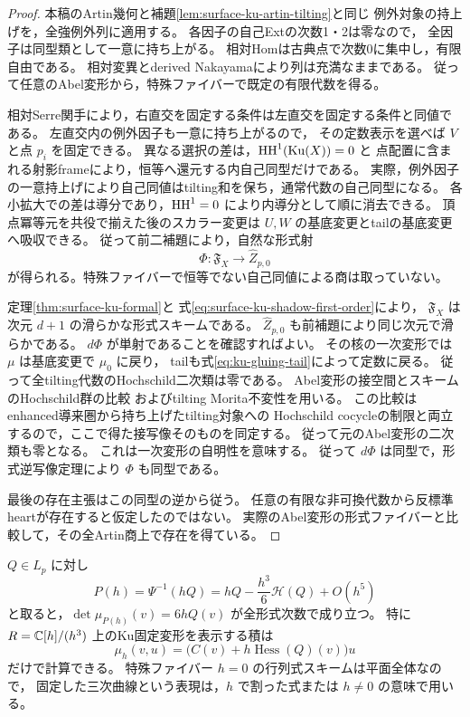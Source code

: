 \begin{proof}
本稿のArtin幾何と補題\ref{lem:surface-ku-artin-tilting}と同じ
例外対象の持上げを，全強例外列に適用する。
各因子の自己Extの次数1・2は零なので，
全因子は同型類として一意に持ち上がる。
相対Homは古典点で次数0に集中し，有限自由である。
相対変異とderived Nakayamaにより列は充満なままである。
従って任意のAbel変形から，特殊ファイバーで既定の有限代数を得る。

相対Serre関手により，右直交を固定する条件は左直交を固定する条件と同値である。
左直交内の例外因子も一意に持ち上がるので，
その定数表示を選べば $V$ と点 $p_i$ を固定できる。
異なる選択の差は，$\operatorname{HH}^1(\operatorname{Ku}(X))=0$ と
点配置に含まれる射影frameにより，恒等へ還元する内自己同型だけである。
実際，例外因子の一意持上げにより自己同値はtilting和を保ち，通常代数の自己同型になる。
各小拡大での差は導分であり，$\operatorname{HH}^1=0$ により内導分として順に消去できる。
頂点冪等元を共役で揃えた後のスカラー変更は
$U,W$ の基底変更とtailの基底変更へ吸収できる。
従って前二補題により，自然な形式射
\[
 \Phi:\mathfrak F_X\longrightarrow\widehat Z_{p,0}
\]
が得られる。特殊ファイバーで恒等でない自己同値による商は取っていない。

定理\ref{thm:surface-ku-formal}と
式\eqref{eq:surface-ku-shadow-first-order}により，
$\mathfrak F_X$ は次元 $d+1$ の滑らかな形式スキームである。
$\widehat Z_{p,0}$ も前補題により同じ次元で滑らかである。
$d\Phi$ が単射であることを確認すればよい。
その核の一次変形では $\mu$ は基底変更で $\mu_0$ に戻り，
tailも式\eqref{eq:ku-gluing-tail}によって定数に戻る。
従って全tilting代数のHochschild二次類は零である。
Abel変形の接空間とスキームのHochschild群の比較
\cite[Theorems~3.1, 4.1.3, 6.1, Corollaries~7.7.2, 7.8.2]{LowenVdBHochschild}
およびtilting Morita不変性を用いる。
この比較はenhanced導来圏から持ち上げたtilting対象への
Hochschild cocycleの制限と両立するので，ここで得た接写像そのものを同定する。
従って元のAbel変形の二次類も零となる。
これは一次変形の自明性を意味する。
従って $d\Phi$ は同型で，形式逆写像定理により $\Phi$ も同型である。

最後の存在主張はこの同型の逆から従う。
任意の有限な非可換代数から反標準heartが存在すると仮定したのではない。
実際のAbel変形の形式ファイバーと比較して，その全Artin商上で存在を得ている。
\end{proof}

\begin{corollary}[固定Ku族の任意次数の計算入力]
\label{cor:ku-gluing-formal-ray}
$Q\in L_p$ に対し
\[
 P(h)=\Psi^{-1}(hQ)
   =hQ-\frac{h^3}{6}\mathcal H(Q)+O(h^5)
\]
と取ると，$\det\mu_{P(h)}(v)=6hQ(v)$ が全形式次数で成り立つ。
特に $R=\mathbb C[h]/(h^3)$ 上のKu固定変形を表示する積は
\[
 \mu_h(v,u)=\bigl(C(v)+h\operatorname{Hess}(Q)(v)\bigr)u
\]
だけで計算できる。
特殊ファイバー $h=0$ の行列式スキームは平面全体なので，
固定した三次曲線という表現は，$h$ で割った式または $h\ne0$ の意味で用いる。
\end{corollary}

